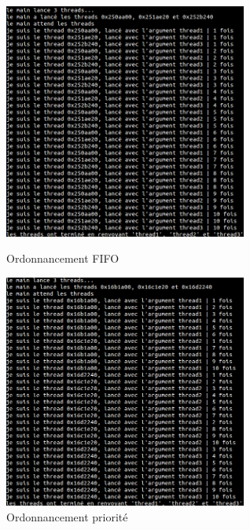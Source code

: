 \begin{figure}[h]
  \begin{minipage}[c]{.45\linewidth}
    \begin{center}
      \includegraphics[width=8cm]{fifo.png}
      \caption{Ordonnancement FIFO}
      \label{fifo}
    \end{center}
  \end{minipage}
  \hfill
  \begin{minipage}[c]{.45\linewidth}
    \begin{center}
      \includegraphics[width=8cm]{prio.png}
      \caption{Ordonnancement priorité}
      \label{prio}
    \end{center}
  \end{minipage}
\end{figure}

